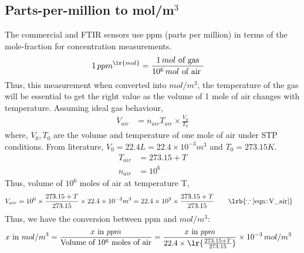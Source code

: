 \subsection{Parts-per-million to mol/m$^3$}

The commercial and FTIR sensors use ppm (parts per million) in terms of the mole-fraction for concentration
measurements.
\begin{align}
    1 \, ppm^{\lr{mol}} &= \frac{1 \, mol \text{ of gas}}{10^6 \, mol \text{ of air }}
\end{align}
Thus, this measurement when converted into $mol/m^3$, the temperature of the gas will be essential to get the right
value as the volume of 1 mole of air changes with temperature. Assuming ideal gas behaviour,
\begin{align}
    V_{air} &= n_{air} T_{air} \times \frac{V_0}{T_0}
    \label{eqn::V_air}
\end{align}
where, $V_0, T_0$ are the volume and temperature of one mole of air under STP conditions. From literature,
$V_0 = 22.4 L = 22.4 \times 10^{-3} m^3$ and $T_0 = 273.15 K$.
\begin{align*}
    T_{air} &= 273.15 + T\\
    n_{air} &= 10^6
\end{align*}
Thus, volume of $10^6$ moles of air at temperature T,
\begin{align}
    V_{air} &= 10^6 \times \frac{273.15 + T}{273.15} \times 22.4 \times 10^{-3} m^3
            = 22.4 \times 10^{3} \times \frac{273.15 + T}{273.15}
    \qquad \lrb{\because \ref{eqn::V_air}}
\end{align}
Thus, we have the conversion between ppm and $mol/m^3$:
\begin{align}
    x \text{ in } mol/m^3 &= \frac{x \text{ in } ppm }{\text{Volume of } 10^6 \text{ moles of air}}
                            = \frac{x \text{ in } ppm}{22.4 \times \lr{\frac{273.15 + T}{273.15}}}
                                \times 10^{-3} \, mol/m^3
\end{align}
